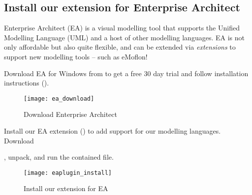 \newpage

\genHeader
\subsection{Install our extension for Enterprise Architect}

Enterprise Architect (EA) is a visual modelling tool that supports the Unified Modelling Language (UML) and a host of other modelling languages.
EA is not only affordable but also quite flexible, and can be extended via \emph{extensions} to support new modelling tools -- such as eMoflon!

\begin{stepbystep}
\item Download\hypertarget{installEA vis}{} EA for Windows from  to get a free 30 day trial and follow
installation instructions ().

\begin{figure}[htbp]
	\centering
  	\texttt{[image: ea\_download]}
	\caption{Download Enterprise Architect}
	\label{enterpriseArchitextHomepage}
\end{figure} 

\item Install our EA extension () to add support for our modelling languages.
Download 

{\footnotesize \eMoflonEAAddin}

, unpack, and run the contained  file.

\begin{figure}[htbp]
	\centering
  \texttt{[image: eaplugin\_install]}
	\caption{Install our extension for EA}
	\label{eaPluginWizard}
\end{figure}
\end{stepbystep}